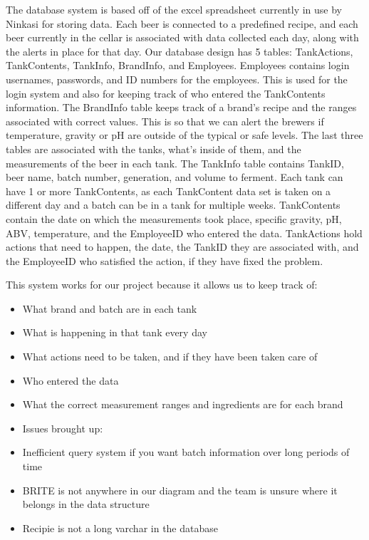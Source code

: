 \documentclass[draftclsnofoot,onecolumn,letterpaper,10pt]{IEEEtran}
\begin{document}
		The database system is based off of the excel spreadsheet currently in use by Ninkasi for storing data.
		Each beer is connected to a predefined recipe, and each beer currently in the cellar is associated with data collected each day, along with the alerts in place for that day.
		Our database design has 5 tables: TankActions, TankContents, TankInfo, BrandInfo, and Employees.
		Employees contains login usernames, passwords, and ID numbers for the employees.
		This is used for the login system and also for keeping track of who entered the TankContents information.
		The BrandInfo table keeps track of a brand’s recipe and the ranges associated with correct values.
		This is so that we can alert the brewers if temperature, gravity or pH are outside of the typical or safe levels.
		The last three tables are associated with the tanks, what’s inside of them, and the measurements of the beer in each tank.
		The TankInfo table contains TankID, beer name, batch number, generation, and volume to ferment.
		Each tank can have 1 or more TankContents, as each TankContent data set is taken on a different day and a batch can be in a tank for multiple weeks.
		TankContents contain the date on which the measurements took place, specific gravity, pH, ABV, temperature, and the EmployeeID who entered the data.
		TankActions hold actions that need to happen, the date, the TankID they are associated with, and the EmployeeID who satisfied the action, if they have fixed the problem.

		This system works for our project because it allows us to keep track of:

		\begin{itemize}
			\item What brand and batch are in each tank
			\item What is happening in that tank every day
			\item What actions need to be taken, and if they have been taken care of
			\item Who entered the data
			\item What the correct measurement ranges and ingredients are for each brand
		\end{itemize}

		\begin{itemize}
			\item Issues brought up:
			\item Inefficient query system if you want batch information over long periods of time
			\item BRITE is not anywhere in our diagram and the team is unsure where it belongs in the data structure
			\item Recipie is not a long varchar in the database
		\end{itemize}
\end{document}
